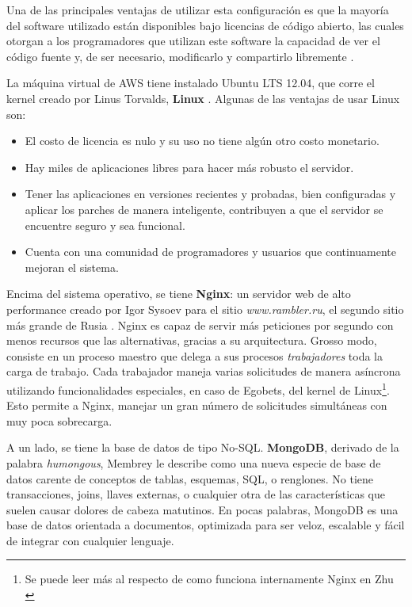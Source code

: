 Una de las principales ventajas de utilizar esta configuración es que la mayoría del software utilizado están disponibles bajo licencias de código abierto, las cuales otorgan a los programadores que utilizan este software la capacidad de ver el código fuente y, de ser necesario, modificarlo y compartirlo libremente \cite{lozano2008software}.

La máquina virtual de AWS tiene instalado Ubuntu LTS 12.04, que corre el kernel creado por Linus Torvalds, \textbf{Linux} \cite{torvalds2001just}. Algunas de las ventajas de usar Linux son:
		\begin{itemize}
 			\item El costo de licencia es nulo y su uso no tiene algún otro costo monetario.
 			\item Hay miles de aplicaciones libres para hacer más robusto el servidor.
 			\item Tener las aplicaciones en versiones recientes y probadas, bien configuradas y aplicar los parches de manera inteligente, contribuyen a que el servidor se encuentre seguro y sea funcional.
 			\item Cuenta con una comunidad de programadores y usuarios que continuamente mejoran el sistema.
 		\end{itemize}

Encima del sistema operativo, se tiene \textbf{Nginx}: un servidor web de alto performance creado por Igor Sysoev para el sitio \emph{www.rambler.ru}, el segundo sitio más grande de Rusia \cite{reese2008nginx}. Nginx es capaz de servir más peticiones por segundo con menos recursos que las alternativas, gracias a su arquitectura. Grosso modo, consiste en un proceso maestro que delega a sus procesos \emph{trabajadores} toda la carga de trabajo. Cada trabajador maneja varias solicitudes de manera asíncrona utilizando funcionalidades especiales, en caso de Egobets, del kernel de Linux\footnote{Se puede leer más al respecto de como funciona internamente Nginx en Zhu \cite{zhu2010nginx}}. Esto permite a Nginx, manejar un gran número de solicitudes simultáneas con muy poca sobrecarga.

A un lado, se tiene la base de datos de tipo No-SQL. \textbf{MongoDB}, derivado de la palabra \emph{humongous}, Membrey \cite{membrey2010definitive} le describe como una nueva especie de base de datos carente de conceptos de tablas, esquemas, SQL, o renglones. No tiene transacciones, joins, llaves externas, o cualquier otra de las características que suelen causar dolores de cabeza matutinos. En pocas palabras, MongoDB es una base de datos orientada a documentos, optimizada para ser veloz, escalable y fácil de integrar con cualquier lenguaje.

